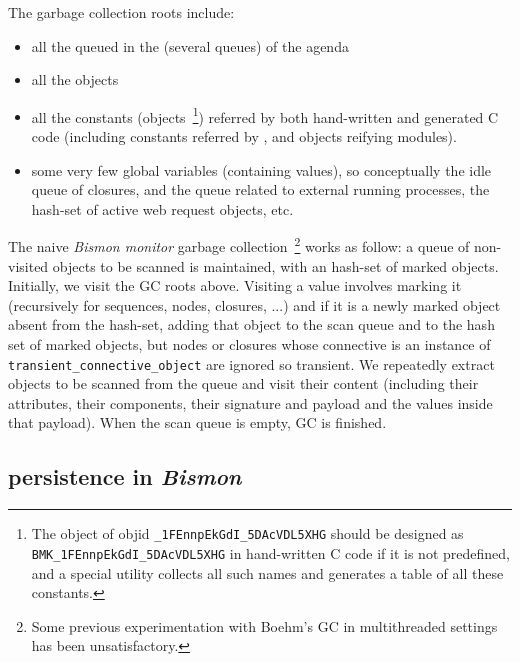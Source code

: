 The garbage collection roots include:

\begin{itemize}
\item all the  queued in the (several queues) of the agenda
\item all the  objects
  \item all the constants (objects~\footnote{The object of objid
    \texttt{\_1FEnnpEkGdI\_5DAcVDL5XHG} should be designed as
    \texttt{BMK\_1FEnnpEkGdI\_5DAcVDL5XHG} in hand-written C code if
    it is not predefined, and a special utility collects all such
    names and generates a table of all these constants.}) referred by
    both hand-written and generated C code (including constants
    referred by , and objects reifying
    modules).
\item some very few global variables (containing values), so
  conceptually the idle queue of closures, and the queue related to
  external running processes, the hash-set of active web request
  objects, etc.
\end{itemize}

The naive \emph{Bismon monitor} garbage collection~\footnote{Some
  previous experimentation with Boehm's GC in multithreaded settings
  has been unsatisfactory.}  works as follow: a queue of non-visited
objects to be scanned is maintained, with an hash-set of marked
objects. Initially, we visit the GC roots above. Visiting a value
involves marking it (recursively for sequences, nodes, closures, ...)
and if it is a newly marked object absent from the hash-set, adding
that object to the scan queue and to the hash set of marked objects,
but nodes or closures whose connective is an instance of
\texttt{transient\_connective\_object} are ignored so transient. We
repeatedly extract objects to be scanned from the queue and visit
their content (including their attributes, their components, their
signature and payload and the values inside that payload). When the
scan queue is empty, GC is finished.

\subsection{persistence in \emph{Bismon}}
\label{subsec:persistence}

